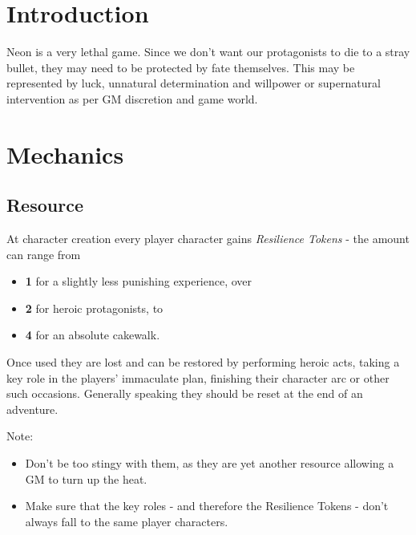 \documentclass[12pt,a4paper,openany]{book}
\begin{document}
	
	
	\chapter{Introduction}
	Neon is a very lethal game. Since we don't want our protagonists to die to a stray bullet, they may need to be protected by fate themselves. 
	This may be represented by luck, unnatural determination and willpower or supernatural intervention as per GM discretion and game world.

	\chapter{Mechanics}
	\section{Resource}
	At character creation every player character gains \emph{Resilience Tokens} - the amount can range from
	\begin{itemize}
		\item \textbf{1} for a slightly less punishing experience, over
		\item \textbf{2} for heroic protagonists, to
		\item \textbf{4} for an absolute cakewalk.
	\end{itemize}
	Once used they are lost and can be restored by performing heroic acts, taking a key role in the players' immaculate plan, finishing their character arc or other such occasions. Generally speaking they should be reset at the end of an adventure.
	\par
	Note: \vspace{-6mm}
	\begin{itemize}
		\setlength\itemsep{-8mm}
		\item Don't be too stingy with them, as they are yet another resource allowing a GM to turn up the heat.
		\item Make sure that the key roles - and therefore the Resilience Tokens - don't always fall to the same player characters.
	\end{itemize}

	\pagebreak
\end{document}
